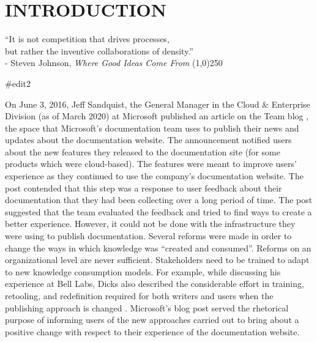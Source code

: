 \chapter{INTRODUCTION}
\label{chap-one}

\begin{flushright}

  ``It is not competition that drives processes,
  \\but rather the inventive collaborations of density.''
  \\- Steven Johnson, \textit{Where Good Ideas Come From}
  \line(1,0){250}
\end{flushright}

#edit2

On June 3, 2016, Jeff Sandquist, the General Manager in the Cloud \& Enterprise Division (as of March 2020) at Microsoft published an article on the Team blog \cite{sandquist}, the space that Microsoft’s documentation team uses to publish their news and updates about the documentation website. The announcement notified users about the new features they released to the documentation site (for some products which were cloud-based). The features were meant to improve users' experience as they continued to use the company’s documentation website. The post contended that this step was a response to user feedback about their documentation that they had been collecting over a long period of time. The post suggested that the team evaluated the feedback and tried to find ways to create a better experience. However, it could not be done with the infrastructure they were using to publish documentation. Several reforms were made in order to change the ways in which knowledge was “created and consumed”. Reforms on an organizational level are never sufficient. Stakeholders need to be trained to adapt to new knowledge consumption models. For example, while discussing his experience at Bell Labs, Dicks also described the considerable effort in training, retooling, and redefinition required for both writers and users when the publishing approach is changed \cite{dicks1994integrating}. Microsoft’s blog post served the rhetorical purpose of informing users of the new approaches carried out to bring about a positive change with respect to their experience of the documentation website.

